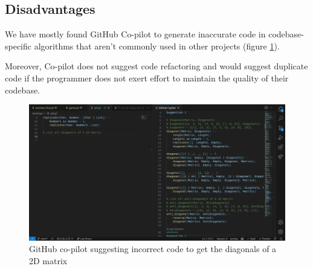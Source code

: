 \documentclass[11pt,a4paper]{article}
\begin{document}
\subsection{Disadvantages}
We have mostly found GitHub Co-pilot to generate inaccurate code in codebase-specific algorithms that aren't commonly
used in other projects (figure \ref{fig:copilot_diagonal}).

Moreover, Co-pilot does not suggest code refactoring and would suggest duplicate code if the programmer does not exert
effort to maintain the quality of their codebase.

\begin{figure}
    \includegraphics[width=\textwidth]{copilot-not-helpful-diagonal-predicate}
    \caption{GitHub co-pilot suggesting incorrect code to get the diagonals of a 2D matrix}
    \label{fig:copilot_diagonal}
\end{figure}
\end{document}
